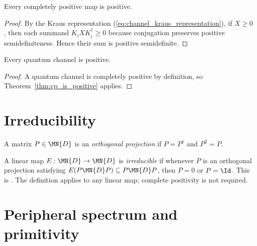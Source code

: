 \begin{theorem}\label{thm:cp_is_positive}
    \leanok
    Every completely positive map is positive.
\end{theorem}

\begin{proof}\leanok
    By the Kraus representation (\ref{eq:channel_kraus_representation}), if
    $X \ge 0$, then each summand $K_i X K_i^\dagger \ge 0$ because
    conjugation preserves positive semidefiniteness. Hence their sum is
    positive semidefinite.
\end{proof}

\begin{theorem}\label{thm:channel_positive}
    \leanok
    Every quantum channel is positive.
\end{theorem}

\begin{proof}\leanok{}
    A quantum channel is completely positive by definition, so
    Theorem~\ref{thm:cp_is_positive} applies.
\end{proof}

\section{Irreducibility}

\begin{definition}
    \label{def:orthogonal_projection_channel}
    \leanok
    A matrix $P \in \MN{D}$ is an \emph{orthogonal projection} if
    $P = P^\dagger$ and $P^2 = P$.
\end{definition}

\begin{definition}\label{def:irreducible_cp}
    \leanok
    A linear map
    $E : \MN{D} \to \MN{D}$ is \emph{irreducible}
    if whenever $P$ is an orthogonal projection satisfying
    $E(P \MN{D} P) \subseteq P \MN{D} P$,
    then $P = 0$ or $P = \Id$.
    This is \cite[Theorem~6.2(1)]{Wolf2012Quantum}.
    The definition applies to any linear map; complete positivity
    is not required.
\end{definition}

\section{Peripheral spectrum and primitivity}

